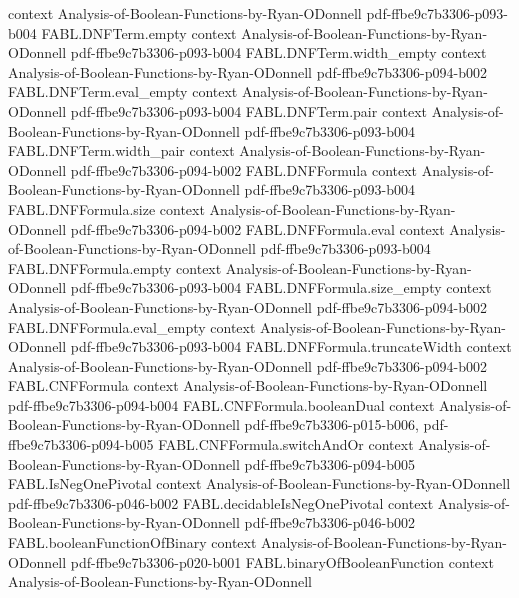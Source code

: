 \begin{theorem}
  {context}
  {Analysis-of-Boolean-Functions-by-Ryan-ODonnell}
  {pdf-ffbe9c7b3306-p093-b004}
\proofstep
  {FABL.DNFTerm.empty}
  {context}
  {Analysis-of-Boolean-Functions-by-Ryan-ODonnell}
  {pdf-ffbe9c7b3306-p093-b004}
\proofstep
  {FABL.DNFTerm.width_empty}
  {context}
  {Analysis-of-Boolean-Functions-by-Ryan-ODonnell}
  {pdf-ffbe9c7b3306-p094-b002}
\proofstep
  {FABL.DNFTerm.eval_empty}
  {context}
  {Analysis-of-Boolean-Functions-by-Ryan-ODonnell}
  {pdf-ffbe9c7b3306-p093-b004}
\proofstep
  {FABL.DNFTerm.pair}
  {context}
  {Analysis-of-Boolean-Functions-by-Ryan-ODonnell}
  {pdf-ffbe9c7b3306-p093-b004}
\proofstep
  {FABL.DNFTerm.width_pair}
  {context}
  {Analysis-of-Boolean-Functions-by-Ryan-ODonnell}
  {pdf-ffbe9c7b3306-p094-b002}
\proofstep
  {FABL.DNFFormula}
  {context}
  {Analysis-of-Boolean-Functions-by-Ryan-ODonnell}
  {pdf-ffbe9c7b3306-p093-b004}
\proofstep
  {FABL.DNFFormula.size}
  {context}
  {Analysis-of-Boolean-Functions-by-Ryan-ODonnell}
  {pdf-ffbe9c7b3306-p094-b002}
\proofstep
  {FABL.DNFFormula.eval}
  {context}
  {Analysis-of-Boolean-Functions-by-Ryan-ODonnell}
  {pdf-ffbe9c7b3306-p093-b004}
\proofstep
  {FABL.DNFFormula.empty}
  {context}
  {Analysis-of-Boolean-Functions-by-Ryan-ODonnell}
  {pdf-ffbe9c7b3306-p093-b004}
\proofstep
  {FABL.DNFFormula.size_empty}
  {context}
  {Analysis-of-Boolean-Functions-by-Ryan-ODonnell}
  {pdf-ffbe9c7b3306-p094-b002}
\proofstep
  {FABL.DNFFormula.eval_empty}
  {context}
  {Analysis-of-Boolean-Functions-by-Ryan-ODonnell}
  {pdf-ffbe9c7b3306-p093-b004}
\proofstep
  {FABL.DNFFormula.truncateWidth}
  {context}
  {Analysis-of-Boolean-Functions-by-Ryan-ODonnell}
  {pdf-ffbe9c7b3306-p094-b002}
\proofstep
  {FABL.CNFFormula}
  {context}
  {Analysis-of-Boolean-Functions-by-Ryan-ODonnell}
  {pdf-ffbe9c7b3306-p094-b004}
\proofstep
  {FABL.CNFFormula.booleanDual}
  {context}
  {Analysis-of-Boolean-Functions-by-Ryan-ODonnell}
  {pdf-ffbe9c7b3306-p015-b006,
    pdf-ffbe9c7b3306-p094-b005}
\proofstep
  {FABL.CNFFormula.switchAndOr}
  {context}
  {Analysis-of-Boolean-Functions-by-Ryan-ODonnell}
  {pdf-ffbe9c7b3306-p094-b005}
\proofstep
  {FABL.IsNegOnePivotal}
  {context}
  {Analysis-of-Boolean-Functions-by-Ryan-ODonnell}
  {pdf-ffbe9c7b3306-p046-b002}
\proofstep
  {FABL.decidableIsNegOnePivotal}
  {context}
  {Analysis-of-Boolean-Functions-by-Ryan-ODonnell}
  {pdf-ffbe9c7b3306-p046-b002}
\proofstep
  {FABL.booleanFunctionOfBinary}
  {context}
  {Analysis-of-Boolean-Functions-by-Ryan-ODonnell}
  {pdf-ffbe9c7b3306-p020-b001}
\proofstep
  {FABL.binaryOfBooleanFunction}
  {context}
  {Analysis-of-Boolean-Functions-by-Ryan-ODonnell}

\end{theorem}

